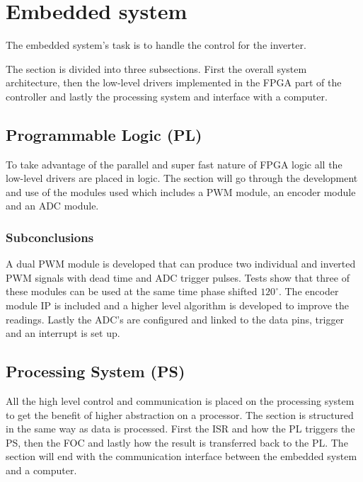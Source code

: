 
\section{Embedded system}
\label{sec:embedded_system}
The embedded system's task is to handle the control for the inverter.

The section is divided into three subsections. First the overall system architecture, then the low-level drivers implemented in the FPGA part of the controller and lastly the processing system and interface with a computer. 






\subsection{Programmable Logic (PL)}
To take advantage of the parallel and super fast nature of FPGA logic all the low-level drivers are placed in logic. The section will go through the development and use of the modules used which includes a PWM module, an encoder module and an ADC module.







\subsubsection*{Subconclusions}
A dual PWM module is developed that can produce two individual and inverted PWM signals with dead time and ADC trigger pulses. Tests show that three of these modules can be used at the same time phase shifted $120^\circ$. The encoder module IP is included and a higher level algorithm is developed to improve the readings. Lastly the ADC's are configured and linked to the data pins, trigger and an interrupt is set up.

\subsection{Processing System (PS)}
All the high level control and communication is placed on the processing system to get the benefit of higher abstraction on a processor. The section is structured in the same way as data is processed. First the ISR and how the PL triggers the PS, then the FOC and lastly how the result is transferred back to the PL. The section will end with the communication interface between the embedded system and a computer.



